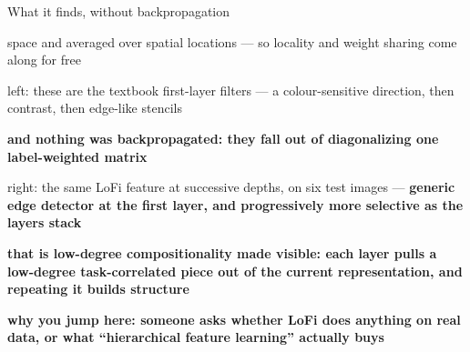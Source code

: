 \documentclass[aspectratio=169,11pt]{beamer}
\begin{document}
\begin{frame}{What it finds, without backpropagation}
{\begin{notelist}
{      space and averaged over spatial locations --- so locality and weight
      sharing come along for free}
    \item left: these are the textbook first-layer filters --- a colour-sensitive
      direction, then contrast, then edge-like stencils
    \item \textbf{and nothing was backpropagated: they fall out of diagonalizing
      one label-weighted matrix}
    \item right: the same LoFi feature at successive depths, on six test images
      --- \textbf{generic edge detector at the first layer, and progressively
      more selective as the layers stack}
    \item \textbf{that is low-degree compositionality made visible: each layer
      pulls a low-degree task-correlated piece out of the current
      representation, and repeating it builds structure}
    \item \textbf{why you jump here: someone asks whether LoFi does anything on
      real data, or what ``hierarchical feature learning'' actually buys}
  \end{notelist}}
\end{frame}
\end{document}
